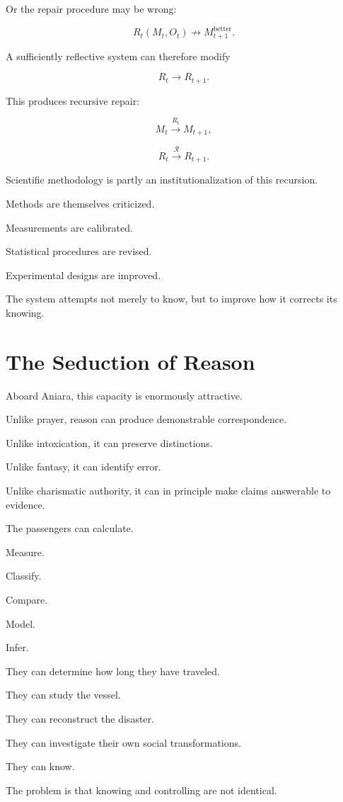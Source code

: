 \documentclass[11pt,oneside]{book}
\theoremstyle{definition}
\theoremstyle{remark}
\begin{document}
Or the repair procedure may be wrong:

\[
R_t(M_t,O_t)
\not\rightarrow
M_{t+1}^{\mathrm{better}}.
\]

A sufficiently reflective system can therefore modify

\[
R_t\rightarrow R_{t+1}.
\]

This produces recursive repair:

\[
M_t
\xrightarrow{R_t}
M_{t+1},
\]

\[
R_t
\xrightarrow{\mathcal R}
R_{t+1}.
\]

Scientific methodology is partly an institutionalization of this recursion.

Methods are themselves criticized.

Measurements are calibrated.

Statistical procedures are revised.

Experimental designs are improved.

The system attempts not merely to know, but to improve how it corrects its knowing.

\section{The Seduction of Reason}

Aboard Aniara, this capacity is enormously attractive.

Unlike prayer, reason can produce demonstrable correspondence.

Unlike intoxication, it can preserve distinctions.

Unlike fantasy, it can identify error.

Unlike charismatic authority, it can in principle make claims answerable to evidence.

The passengers can calculate.

Measure.

Classify.

Compare.

Model.

Infer.

They can determine how long they have traveled.

They can study the vessel.

They can reconstruct the disaster.

They can investigate their own social transformations.

They can know.

The problem is that knowing and controlling are not identical.
\end{document}
